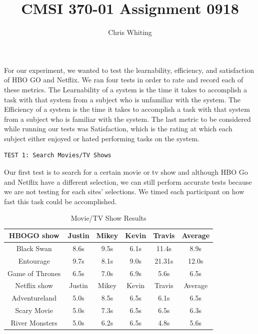 \documentclass[11pt]{article}
\title{CMSI 370-01 Assignment 0918}
\author{Chris Whiting}
\begin{document}
\maketitle

For our experiment, we wanted to test the learnability, efficiency, and satisfaction of HBO GO and Netflix. We ran four tests in order to rate and record each of these metrics. The Learnability of a system is the time it takes to accomplish a task with that system from a subject who is unfamiliar with the system. The Efficiency of a system is the time it takes to accomplish a task with that system from a subject who is familiar with the system. The last metric to be considered while running our tests was Satisfaction, which is the rating at which each subject either enjoyed or hated performing tasks on the system. 
 
\begin{verbatim}
TEST 1: Search Movies/TV Shows
\end{verbatim}
Our first test is to search for a certain movie or tv show and although HBO Go and Netflix have a different selection, we can still perform accurate tests because we are not testing for each sites' selections. We timed each participant on how fast this task could be accomplished. 

\begin{table}[ht]
\caption{Movie/TV Show Results} %
\centering %
\begin{tabular}{|c|c c c c| c |}  %
\hline\hline %
HBOGO show  &Justin& Mikey&Kevin&Travis&Average  \\ [0.5ex] %
\hline %
Black Swan  & 8.6s & 9.5s&6.1s &11.4s&8.9s    \\ %
Entourage &9.7s&8.1s&9.0s &21.31s&12.0s  \\
Game of Thrones &6.5s&7.0s&6.9s &5.6s&6.5s \\ 
\hline %
Netflix show &Justin& Mikey&Kevin&Travis&Average   \\ [0.5ex]
\hline
Adventureland &5.0s&8.5s&6.5s&6.1s&6.5s   \\
Scary Movie &5.0s&7.3s&6.5s&6.5s& 6.3s    \\
River Monsters &5.0s&6.2s&6.5s&4.8s&5.6s      \\
\hline
\end{tabular}
\label{table:nonlin} %
\end{table}
\end{document}
